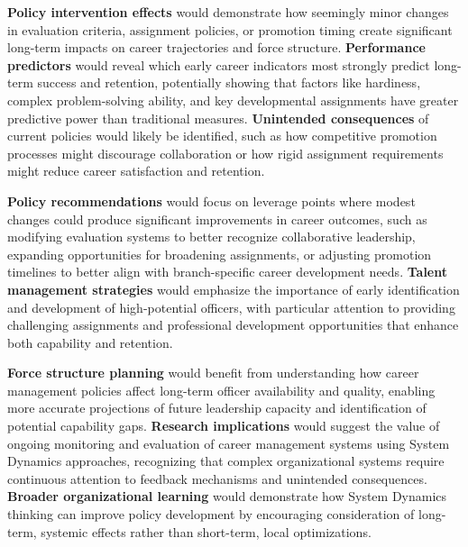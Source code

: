 \documentclass[main.tex]{subfiles}
\begin{document}
\textbf{Policy intervention effects} would demonstrate how seemingly minor changes in evaluation criteria, assignment policies, or promotion timing create significant long-term impacts on career trajectories and force structure. \textbf{Performance predictors} would reveal which early career indicators most strongly predict long-term success and retention, potentially showing that factors like hardiness, complex problem-solving ability, and key developmental assignments have greater predictive power than traditional measures. \textbf{Unintended consequences} of current policies would likely be identified, such as how competitive promotion processes might discourage collaboration or how rigid assignment requirements might reduce career satisfaction and retention.


\textbf{Policy recommendations} would focus on leverage points where modest changes could produce significant improvements in career outcomes, such as modifying evaluation systems to better recognize collaborative leadership, expanding opportunities for broadening assignments, or adjusting promotion timelines to better align with branch-specific career development needs\parencite{dulce_thesis}. \textbf{Talent management strategies} would emphasize the importance of early identification and development of high-potential officers, with particular attention to providing challenging assignments and professional development opportunities that enhance both capability and retention.

\textbf{Force structure planning} would benefit from understanding how career management policies affect long-term officer availability and quality, enabling more accurate projections of future leadership capacity and identification of potential capability gaps. \textbf{Research implications} would suggest the value of ongoing monitoring and evaluation of career management systems using System Dynamics approaches, recognizing that complex organizational systems require continuous attention to feedback mechanisms and unintended consequences. \textbf{Broader organizational learning} would demonstrate how System Dynamics thinking can improve policy development by encouraging consideration of long-term, systemic effects rather than short-term, local optimizations.

\end{document}
